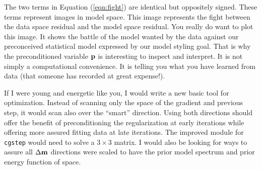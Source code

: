 The two terms in Equation (\ref{eqn:fight})
are identical but oppositely signed.
These terms represent images in model space.
This image represents the fight between
the data space residual and the model space residual.
You really do want to plot this image.
It shows the battle of
the model wanted by the data
against
our preconceived statistical model expressed by our model styling goal.
That is why the preconditioned variable $\bold p$ is interesting to inspect and interpret.
It is not simply a computational convenience.
It is telling you what you have learned from data
(that someone has recorded at great expense!).
\par
{}

\par
If I were young and energetic like you,
I would write a new basic tool for optimization.
Instead of scanning only the space of the gradient and previous step,
it would scan also over the ``smart'' direction.  
Using both directions should offer the benefit of preconditioning
the regularization at early iterations
while offering more assured fitting data at late iterations.
The improved 
module for \texttt{cgstep}
would need to solve a $3\times 3$ matrix.
I would also be looking for ways to
assure all $\Delta\bold m$ directions
were scaled to have the prior model spectrum and prior energy function of space.


